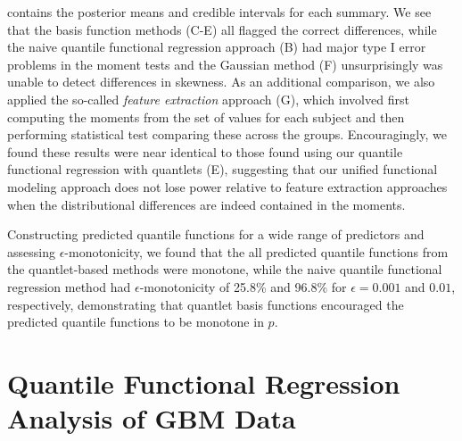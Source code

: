 \documentclass[11pt]{article}
\begin{document}
contains the posterior means and credible intervals for each summary.  We see that the basis function methods (C-E) all flagged the
correct differences, while the naive quantile functional regression approach (B) had major type I error problems in the moment tests and the 
Gaussian method (F) unsurprisingly was unable
to detect differences in skewness.  As an additional comparison, we also applied the so-called {\it feature extraction} approach (G), which involved first
computing the moments from the set of values for each subject and then performing statistical test comparing these across the groups.  Encouragingly, we found
these results were near identical to those found using our quantile functional regression with quantlets (E), suggesting that our unified functional
modeling approach does not lose power relative to feature extraction approaches when the distributional differences are indeed contained in the
moments. 

Constructing predicted quantile functions for a wide range of predictors and assessing $\epsilon$-monotonicity, we found that the all predicted quantile functions from the quantlet-based methods were monotone, while the naive quantile functional regression method had $\epsilon$-monotonicity of 25.8\% and 96.8\% for $\epsilon=0.001$ and $0.01$, respectively, demonstrating that quantlet basis functions encouraged the predicted quantile functions to be monotone in $p$.



\section{{\bf Quantile Functional Regression Analysis of GBM Data}}
\end{document}
